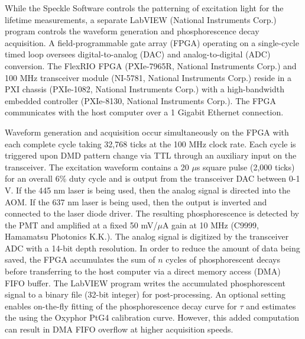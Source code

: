 While the Speckle Software controls the patterning of excitation light for the lifetime measurements, a separate LabVIEW (National Instruments Corp.) program controls the waveform generation and phosphorescence decay acquisition. A field-programmable gate array (FPGA) operating on a single-cycle timed loop oversees digital-to-analog (DAC) and analog-to-digital (ADC) conversion. The FlexRIO FPGA (PXIe-7965R, National Instruments Corp.) and 100 MHz transceiver module (NI-5781, National Instruments Corp.) reside in a PXI chassis (PXIe-1082, National Instruments Corp.) with a high-bandwidth embedded controller (PXIe-8130, National Instruments Corp.). The FPGA communicates with the host computer over a 1 Gigabit Ethernet connection.

Waveform generation and acquisition occur simultaneously on the FPGA with each complete cycle taking 32,768 ticks at the 100 MHz clock rate. Each cycle is triggered upon DMD pattern change via TTL through an auxiliary input on the transceiver. The excitation waveform contains a 20 $\mu$s square pulse (2,000 ticks) for an overall 6\% duty cycle and is output from the transceiver DAC between 0-1 V. If the 445 nm laser is being used, then the analog signal is directed into the AOM. If the 637 nm laser is being used, then the output is inverted and connected to the laser diode driver. The resulting phosphorescence is detected by the PMT and amplified at a fixed 50 mV/$\mu$A gain at 10 MHz (C9999, Hamamatsu Photonics K.K.). The analog signal is digitized by the transceiver ADC with a 14-bit depth resolution. In order to reduce the amount of data being saved, the FPGA accumulates the sum of $n$ cycles of phosphorescent decays before transferring to the host computer via a direct memory access (DMA) FIFO buffer. The LabVIEW program writes the accumulated phosphorescent signal to a binary file (32-bit integer) for post-processing. An optional setting enables on-the-fly fitting of the phosphorescence decay curve for $\tau$ and estimates the  using the Oxyphor PtG4 calibration curve. However, this added computation can result in DMA FIFO overflow at higher acquisition speeds.

